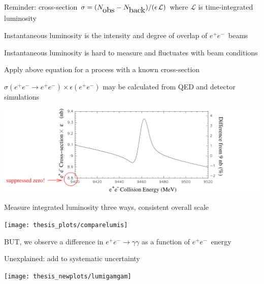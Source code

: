 \documentclass[landscape]{article}
\newcommand{\subs}[1]{{\mbox{\large #1}}}
\newcommand{\ee}{$e^+e^-$}
\begin{document}
\begin{slide:luminosity}

Reminder: cross-section $\displaystyle \sigma = (N_\subs{obs} - N_\subs{back})/(\epsilon \, {\mathcal L})$ where ${\mathcal L}$ is time-integrated luminosity

\vfill
Instantaneous luminosity is the intensity and degree of overlap of \ee\ beams

\vfill
Instantaneous luminosity is hard to measure and fluctuates with beam conditions

\vfill
Apply above equation for a process with a known cross-section

\vfill
$\sigma(e^+e^- \to e^+e^-) \times \epsilon(e^+e^-)$ may be calculated from QED and detector simulations

\vfill
\begin{center}
\includegraphics[width=0.9\linewidth]{plots/allee}
\end{center}

\vspace{-2 cm}
\end{slide:luminosity}

\begin{slide:luminosity}

Measure integrated luminosity three ways, consistent overall scale

\vfill
\begin{center}
\texttt{[image: thesis\_plots/comparelumis]}
\end{center}

\end{slide:luminosity}

\begin{slide:luminosity}

BUT, we observe a difference in $e^+e^- \to \gamma\gamma$ as a function of \ee\ energy

\vfill
Unexplained: add to systematic uncertainty

\vfill
\begin{center}
\texttt{[image: thesis\_newplots/lumigamgam]}
\end{center}

\vspace{-1 cm}
\end{slide:luminosity}
\end{document}
